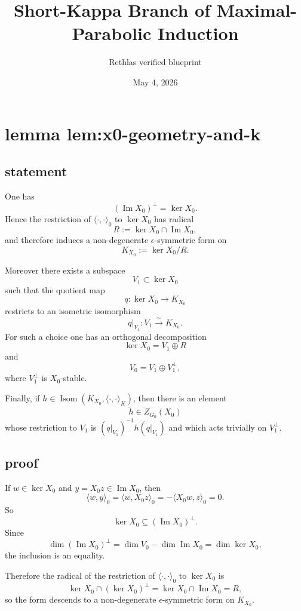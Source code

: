 \documentclass[
  11pt,
]{article}
\title{Short-Kappa Branch of Maximal-Parabolic Induction}
\author{Rethlas verified blueprint}
\date{May 4, 2026}
\begin{document}
\maketitle

\section{lemma lem:x0-geometry-and-k}\label{lemma-lemx0-geometry-and-k}

\subsection{statement}\label{statement}

One has \[
(\operatorname{Im} X_0)^\perp=\ker X_0.
\] Hence the restriction of \(\langle\cdot,\cdot\rangle_0\) to
\(\ker X_0\) has radical \[
R:=\ker X_0\cap \operatorname{Im} X_0,
\] and therefore induces a non-degenerate \(\epsilon\)-symmetric form on
\[
K_{X_0}:=\ker X_0/R.
\]

Moreover there exists a subspace \[
V_1\subset \ker X_0
\] such that the quotient map \[
q:\ker X_0\to K_{X_0}
\] restricts to an isometric isomorphism \[
q|_{V_1}:V_1\xrightarrow{\sim} K_{X_0}.
\] For such a choice one has an orthogonal decomposition \[
\ker X_0=V_1\oplus R
\] and \[
V_0=V_1\oplus V_1^\perp,
\] where \(V_1^\perp\) is \(X_0\)-stable.

Finally, if
\(h\in \operatorname{Isom}(K_{X_0},\langle\cdot,\cdot\rangle_K)\), then
there is an element \[
\widetilde h\in Z_{G_0}(X_0)
\] whose restriction to \(V_1\) is \((q|_{V_1})^{-1} h (q|_{V_1})\) and
which acts trivially on \(V_1^\perp\).

\subsection{proof}\label{proof}

If \(w\in \ker X_0\) and \(y=X_0 z\in \operatorname{Im} X_0\), then \[
\langle w,y\rangle_0=\langle w,X_0 z\rangle_0=-\langle X_0 w,z\rangle_0=0.
\] So \[
\ker X_0\subseteq (\operatorname{Im} X_0)^\perp.
\] Since \[
\dim (\operatorname{Im} X_0)^\perp
=\dim V_0-\dim \operatorname{Im} X_0
=\dim \ker X_0,
\] the inclusion is an equality.

Therefore the radical of the restriction of
\(\langle\cdot,\cdot\rangle_0\) to \(\ker X_0\) is \[
\ker X_0\cap (\ker X_0)^\perp
=\ker X_0\cap \operatorname{Im} X_0
=R,
\] so the form descends to a non-degenerate \(\epsilon\)-symmetric form
on \(K_{X_0}\).
\end{document}
